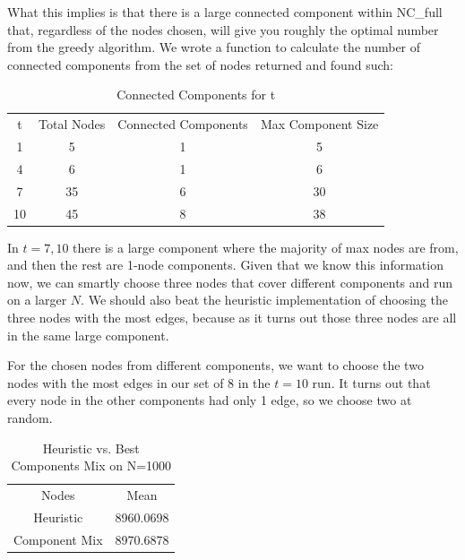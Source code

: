 \documentclass{article}
\begin{document}
	What this implies is that there is a large connected component within NC\_full that, regardless of the nodes chosen, will give you roughly the optimal number from the greedy algorithm. We wrote a function to calculate the number of connected components from the set of nodes returned and found such:
	
	\begin{table}[h!]
		\begin{center}
			\caption{Connected Components for t}
			\label{tab:table3}
			\begin{tabular}{|c|c|c|c|} 
				\hline
				t & Total Nodes & Connected Components & Max Component Size\\
				1  & 5 & 1 & 5\\
				4  & 6 & 1 & 6\\
				7  & 35 & 6 & 30\\
				10 & 45 & 8 & 38\\
				\hline
			\end{tabular}
		\end{center}
	\end{table}
	
	In $t=7,10$ there is a large component where the majority of max nodes are from, and then the rest are 1-node components. Given that we know this information now, we can smartly choose three nodes that cover different components and run on a larger $N$. We should also beat the heuristic implementation of choosing the three nodes with the most edges, because as it turns out those three nodes are all in the same large component.
	
	For the chosen nodes from different components, we want to choose the two nodes with the most edges in our set of 8 in the $t=10$ run. It turns out that every node in the other components had only 1 edge, so we choose two at random.
	
	\begin{table}[h!]
		\begin{center}
			\caption{Heuristic vs. Best Components Mix on N=1000}
			\label{tab:table4}
			\begin{tabular}{|c|c|} 
				\hline
				Nodes & Mean\\
				Heuristic & 8960.0698 \\
				Component Mix & 8970.6878 \\
				\hline
			\end{tabular}
		\end{center}
	\end{table}
	
\end{document}
